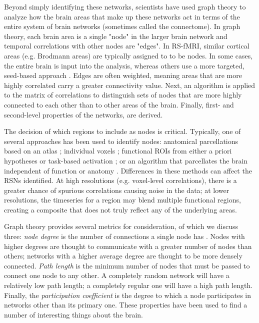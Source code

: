 Beyond simply identifying these networks, scientists have used graph theory to analyze how the brain areas that make up these networks act in terms of the entire system of brain networks (sometimes called the connectome). In graph theory, each brain area is a single "node" in the larger brain network and temporal correlations with other nodes are "edges". In RS-fMRI, similar cortical areas (e.g. Brodmann areas) are typically assigned to to be nodes. In some cases, the entire brain is input into the analysis, whereas others use a more targeted, seed-based approach \citep{Vogel2010}.  Edges are often weighted, meaning areas that are more highly correlated carry a greater connectivity value. Next, an algorithm is applied to the matrix of correlations to distinguish sets of nodes that are more highly connected to each other than to other areas of the brain. Finally, first- and second-level properties of the networks, are derived.

The decision of which regions to include as nodes is critical. Typically, one of several approaches has been used to identify nodes: anatomical parcellations based on an atlas \citep{Supekar2008, Liu2008, Lynall2010}; individual voxels \citep{Fair2007}; functional ROIs from either a priori hypotheses or task-based activation \citep{VandenHeuvel2010}; or an algorithm that parcellates the brain independent of function or anatomy \citep{Goni2014}.  Differences in these methods can affect the RSNs identified. At high resolutions (e.g. voxel-level correlations), there is a greater chance of spurious correlations causing noise in the data; at lower resolutions, the timeseries for a region may blend multiple functional regions, creating a composite that does not truly reflect any of the underlying areas. 

Graph theory provides several metrics for consideration, of which we discuss three: \textit{node degree} is the number of connections a single node has \citep{Sporns2013}. Nodes with higher degrees are thought to communicate with a greater number of nodes than others; networks with a higher average degree are thought to be more densely connected. \textit{Path length} is the minimum number of nodes that must be passed to connect one node to any other. A completely random network will have a relatively low path length; a completely regular one will have a high path length. Finally, the \textit{participation coefficient} is the degree to which a node participates in networks other than its primary one. These properties have been used to find a number of interesting things about the brain. 

